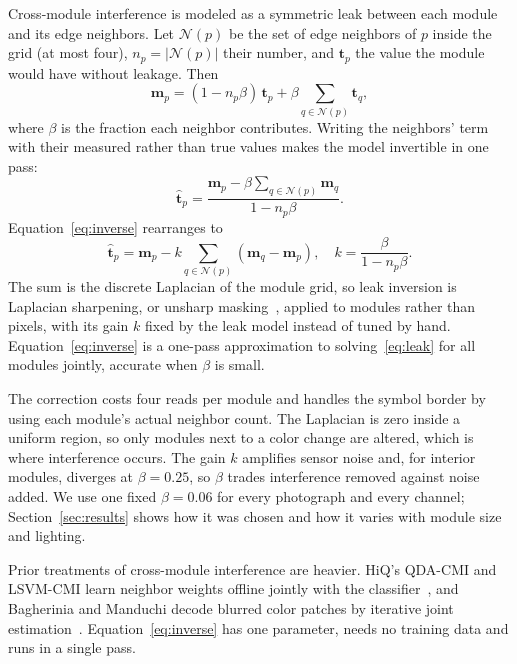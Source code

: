 Cross-module interference is modeled as a symmetric leak between each module and its
edge neighbors. Let $\mathcal{N}(p)$ be the set of edge neighbors of $p$ inside the grid (at
most four), $n_p = |\mathcal{N}(p)|$ their number, and $\mathbf{t}_p$ the value the module
would have without leakage. Then
\begin{equation}
\mathbf{m}_p = (1 - n_p\beta)\,\mathbf{t}_p + \beta \sum_{q \in \mathcal{N}(p)} \mathbf{t}_q ,
\label{eq:leak}
\end{equation}
where $\beta$ is the fraction each neighbor contributes. Writing the neighbors' term with
their measured rather than true values makes the model invertible in one pass:
\begin{equation}
\hat{\mathbf{t}}_p = \frac{\mathbf{m}_p - \beta \sum_{q \in \mathcal{N}(p)} \mathbf{m}_q}{1 - n_p\beta} .
\label{eq:inverse}
\end{equation}
Equation~\eqref{eq:inverse} rearranges to
\begin{equation}
\hat{\mathbf{t}}_p = \mathbf{m}_p - k \sum_{q \in \mathcal{N}(p)} (\mathbf{m}_q - \mathbf{m}_p) ,
\quad k = \frac{\beta}{1 - n_p\beta} .
\label{eq:laplacian}
\end{equation}
The sum is the discrete Laplacian of the module grid, so leak inversion is Laplacian
sharpening, or unsharp masking~\cite{gonzalez2018dip}, applied to modules rather than
pixels, with its gain $k$ fixed by the leak model instead of tuned by hand.
Equation~\eqref{eq:inverse} is a one-pass approximation to solving~\eqref{eq:leak} for all
modules jointly, accurate when $\beta$ is small.

The correction costs four reads per module and handles the symbol border by using each
module's actual neighbor count. The Laplacian is zero inside a uniform region, so only
modules next to a color change are altered, which is where interference occurs. The gain
$k$ amplifies sensor noise and, for interior modules, diverges at $\beta = 0.25$, so $\beta$
trades interference removed against noise added. We use one fixed $\beta = 0.06$ for every photograph and every channel; Section~\ref{sec:results}
shows how it was chosen and how it varies with module size and lighting.

Prior treatments of cross-module interference are heavier. HiQ's QDA-CMI and LSVM-CMI
learn neighbor weights offline jointly with the classifier~\cite{yang2018hiq}, and
Bagherinia and Manduchi decode blurred color patches by iterative joint
estimation~\cite{bagherinia2014blur}. Equation~\eqref{eq:inverse} has one parameter, needs
no training data and runs in a single pass.

